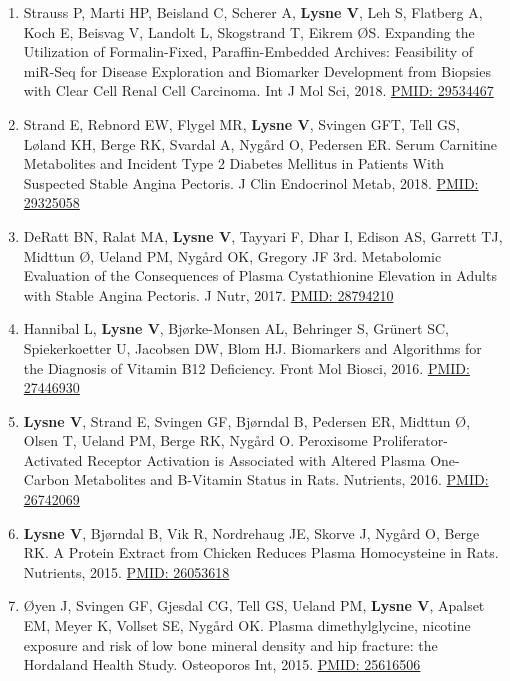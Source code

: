 \documentclass[11pt, a4paper]{awesome-cv}
\begin{document}
\begin{enumerate}
\item
  Strauss P, Marti HP, Beisland C, Scherer A, \textbf{Lysne V}, Leh S,
  Flatberg A, Koch E, Beisvag V, Landolt L, Skogstrand T, Eikrem ØS.
  Expanding the Utilization of Formalin-Fixed, Paraffin-Embedded
  Archives: Feasibility of miR-Seq for Disease Exploration and Biomarker
  Development from Biopsies with Clear Cell Renal Cell Carcinoma. Int J
  Mol Sci, 2018.
  \href{https://www.ncbi.nlm.nih.gov/pubmed/29534467}{PMID: 29534467}
\item
  Strand E, Rebnord EW, Flygel MR, \textbf{Lysne V}, Svingen GFT, Tell
  GS, Løland KH, Berge RK, Svardal A, Nygård O, Pedersen ER. Serum
  Carnitine Metabolites and Incident Type 2 Diabetes Mellitus in
  Patients With Suspected Stable Angina Pectoris. J Clin Endocrinol
  Metab, 2018. \href{https://www.ncbi.nlm.nih.gov/pubmed/29325058}{PMID:
  29325058}
\item
  DeRatt BN, Ralat MA, \textbf{Lysne V}, Tayyari F, Dhar I, Edison AS,
  Garrett TJ, Midttun Ø, Ueland PM, Nygård OK, Gregory JF 3rd.
  Metabolomic Evaluation of the Consequences of Plasma Cystathionine
  Elevation in Adults with Stable Angina Pectoris. J Nutr, 2017.
  \href{https://www.ncbi.nlm.nih.gov/pubmed/28794210}{PMID: 28794210}
\item
  Hannibal L, \textbf{Lysne V}, Bjørke-Monsen AL, Behringer S, Grünert
  SC, Spiekerkoetter U, Jacobsen DW, Blom HJ. Biomarkers and Algorithms
  for the Diagnosis of Vitamin B12 Deficiency. Front Mol Biosci, 2016.
  \href{https://www.ncbi.nlm.nih.gov/pubmed/}{PMID: 27446930}
\item
  \textbf{Lysne V}, Strand E, Svingen GF, Bjørndal B, Pedersen ER,
  Midttun Ø, Olsen T, Ueland PM, Berge RK, Nygård O. Peroxisome
  Proliferator-Activated Receptor Activation is Associated with Altered
  Plasma One-Carbon Metabolites and B-Vitamin Status in Rats. Nutrients,
  2016. \href{https://www.ncbi.nlm.nih.gov/pubmed/26742069}{PMID:
  26742069}
\item
  \textbf{Lysne V}, Bjørndal B, Vik R, Nordrehaug JE, Skorve J, Nygård
  O, Berge RK. A Protein Extract from Chicken Reduces Plasma
  Homocysteine in Rats. Nutrients, 2015.
  \href{https://www.ncbi.nlm.nih.gov/pubmed/26053618}{PMID: 26053618}
\item
  Øyen J, Svingen GF, Gjesdal CG, Tell GS, Ueland PM, \textbf{Lysne V},
  Apalset EM, Meyer K, Vollset SE, Nygård OK. Plasma dimethylglycine,
  nicotine exposure and risk of low bone mineral density and hip
  fracture: the Hordaland Health Study. Osteoporos Int, 2015.
  \href{https://www.ncbi.nlm.nih.gov/pubmed/25616506}{PMID: 25616506}
\end{enumerate}
\end{document}
